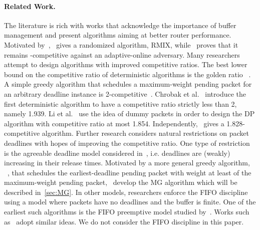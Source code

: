 \documentclass[oribibl]{llncs}
\begin{document}
\paragraph {Related Work.} The literature is rich with works that
acknowledge the importance of buffer management and present algorithms aiming at better router performance. Motivated by~\cite{kesselman04},~\cite{chin06}
gives a randomized algorithm, RMIX, while~\cite{bienkowski08} proves that it remains
-competitive against an adaptive-online
adversary. Many researchers attempt to design algorithms
with improved competitive ratios. The best lower bound on the
competitive ratio of deterministic algorithms is the golden ratio
~\cite{hajek01,chin03}. A simple greedy algorithm that schedules
a maximum-weight pending packet for an arbitrary deadline instance is 2-competitive~\cite{hajek01,kesselman04}. Chrobak et al.~\cite{chrobak04} introduce the first deterministic algorithm to have a competitive ratio strictly less than 2, namely 1.939. Li et al.~\cite{li07} use the idea of dummy packets in order to design the DP algorithm with competitive ratio at most 1.854. Independently,~\cite{englert07} gives a 1.828-competitive algorithm. Further research considers natural restrictions on packet deadlines with hopes of improving the competitive ratio. One type of restriction is the agreeable deadline model considered
in~\cite{jez12}, i.e. deadlines are (weakly) increasing in their
release times. Motivated by a more general
greedy algorithm, ~\cite{chin06}, that schedules the earliest-deadline
pending packet with weight at least  of the maximum-weight
pending packet,~\cite{jez12}  develop the MG algorithm
which will be described in~\ref{sec:MG}. In other models, researchers enforce the FIFO discipline using a model where packets have no deadlines and the buffer is finite. One of the earliest such algorithms is the FIFO preemptive model studied by~\cite{andelman03}. Works such as~\cite{englert06,kesselman05,lotker02} adopt similar ideas. We do not consider the FIFO discipline in this paper.
\end{document}
